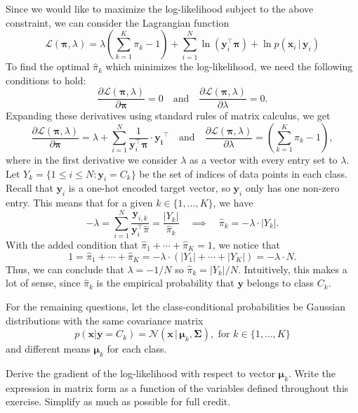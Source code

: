 \documentclass[expanded]{lkx_pset}
\begin{document}
\begin{parts}
	Since we would like to maximize the log-likelihood subject to the above constraint, we can consider the Lagrangian function
	\[
		\mathcal{L}(\bm{\pi}, \lambda) = \lambda\left(\sum^K_{k=1} \pi_k - 1\right)
		+\sum^N_{i=1}\ln(\bm{y}_i^\intercal \bm{\pi}) +\ln p(\bm{x}_i\,|\,\bm{y}_i)
	\]
	To find the optimal $\widehat \pi_k$ which minimizes the log-likelihood, we need the following conditions to hold:
	\[
		\frac{\partial \mathcal{L}(\bm{\pi}, \lambda)}{\partial \bm{\pi}} = 0 \quad\textrm{and}\quad \frac{\partial \mathcal{L}(\bm{\pi}, \lambda)}{\partial \lambda} = 0.
	\]
	Expanding these derivatives using standard rules of matrix calculus, we get
	\[
		\frac{\partial \mathcal{L}(\bm{\pi}, \lambda)}{\partial \bm{\pi}} = \lambda + \sum_{i=1}^N \frac{1}{\bm{y}_i^\intercal \bm{\pi}}\cdot \bm{y_i}^\intercal\quad \textrm{and}\quad \frac{\partial \mathcal{L}(\bm{\pi}, \lambda)}{\partial \lambda} = \left(\sum^K_{k=1} \pi_k - 1\right),
	\]
	where in the first derivative we consider $\lambda$ as a vector with every entry set to $\lambda$.
	Let $Y_k = \{1 \leq i \leq N : \bm{y}_i = C_k\}$ be the set of indices of data points in each class.
	Recall that $\bm{y}_i$ is a one-hot encoded target vector, so $\bm{y}_i$ only has one non-zero entry. This means that for a given $k\in \{1,\ldots, K\}$, we have
	\[
		-\lambda = \sum_{i=1}^N\frac{\bm{y}_{i,k}}{\bm{y}_i^\intercal \widehat{\pi}} = \frac{|Y_k|}{\widehat\pi_k} \quad\implies \quad \widehat{\pi}_k = -\lambda\cdot |Y_k|.
	\]
	With the added condition that $\widehat{\pi}_1+\cdots+\widehat{\pi}_K=1$, we notice that
	\[
		1=\widehat{\pi}_1+\cdots + \widehat{\pi}_K = -\lambda \cdot \left(|Y_1| + \cdots + |Y_K|\right) = -\lambda \cdot N.
	\]
	Thus, we can conclude that $\lambda = -1/N$ so $
		\widehat{\pi}_k = |Y_k|/N$.
	Intuitively, this makes a lot of sense, since $\widehat{\pi}_k$ is the empirical probability that $\bm{y}$ belongs to class $C_k$.

	\begin{part}{}
		For the remaining questions, let the
		class-conditional probabilities be Gaussian distributions with
		the same covariance matrix
		$$p(\bm{x} | \bm{y}= C_k) = \mathcal{N}(\bm{x}\,|\, \bm{\mu}_k, \bm{\Sigma}), \text{\ for\ }k \in \{1,\ldots, K\}$$
		and different means $\bm{\mu}_k$ for each class.
	\end{part}

	\begin{part}{3}
		Derive the gradient of the log-likelihood with respect to vector $\bm{\mu}_k$.
		Write the expression in matrix form as a function of the variables defined
		throughout this exercise. Simplify as much as possible for full credit.
	\end{part}


\end{parts}
\end{document}
